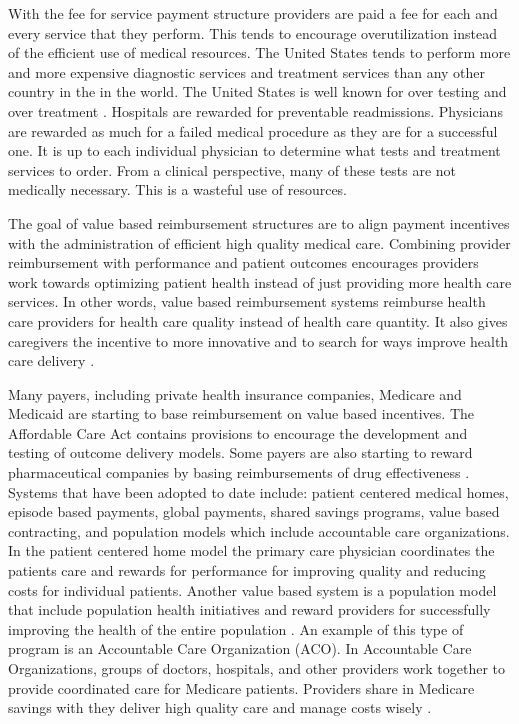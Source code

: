 \documentclass[sigconf]{acmart}
\begin{document}
With the fee for service payment structure providers are paid a fee for each and every service that they perform. This tends to encourage overutilization instead of the efficient use of medical resources. The United States tends to perform more and more expensive diagnostic services and treatment services than any other country in the in the world. The United States is well known for over testing and over treatment \cite{www-google-PBSO}.  Hospitals are rewarded for preventable readmissions. Physicians are rewarded as much for a failed medical procedure as they are for a successful one.  It is up to each individual physician to determine what tests and treatment services to order.  From a clinical perspective, many of these tests are not medically necessary. This is a wasteful use of resources.

The goal of value based reimbursement structures are to align payment incentives with the administration of efficient high quality medical care. Combining provider reimbursement with performance and patient outcomes encourages providers work towards optimizing patient health instead of just providing more health care services. In other words, value based reimbursement systems reimburse health care providers for health care quality instead of health care quantity.   It also gives caregivers the incentive to more innovative and to search for ways improve health care delivery \cite{www-google-christian}.

Many payers, including private health insurance companies, Medicare and Medicaid are starting to base reimbursement on value based incentives. The Affordable Care Act contains provisions to encourage the development and testing of outcome delivery models.  Some payers are also starting to reward pharmaceutical companies by basing reimbursements of drug effectiveness \cite{www-google-McKinsey}. 
 Systems that have been adopted to date include: patient centered medical homes, episode based payments, global payments, shared savings programs, value based contracting, and population models which include accountable care organizations.  In the patient centered home model the primary care physician coordinates the patients care and rewards for performance for improving quality and reducing costs for individual patients. Another value based system is a population model that include population health initiatives and reward providers for successfully improving the health of the entire population \cite{www-google-liason}. An example of this type of program is an Accountable Care Organization (ACO). In Accountable Care Organizations, groups of doctors, hospitals, and other providers work together to provide coordinated care for Medicare patients. Providers share in Medicare savings with they deliver high quality care and manage costs wisely \cite{www-google-ACO}.
 
\end{document}
